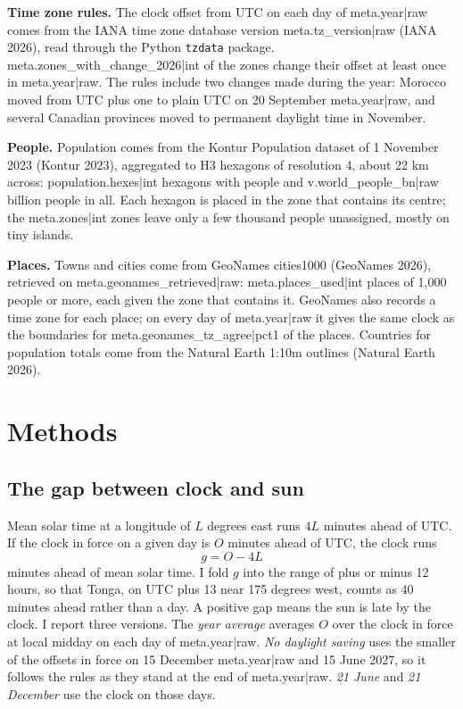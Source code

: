 \documentclass[11pt,a4paper]{article}
\begin{document}
\textbf{Time zone rules.} The clock offset from UTC on each day of {{meta.year|raw}} comes from the IANA time zone database version {{meta.tz_version|raw}} (IANA 2026), read through the Python \texttt{tzdata} package. {{meta.zones_with_change_2026|int}} of the zones change their offset at least once in {{meta.year|raw}}. The rules include two changes made during the year: Morocco moved from UTC plus one to plain UTC on 20 September {{meta.year|raw}}, and several Canadian provinces moved to permanent daylight time in November.

\textbf{People.} Population comes from the Kontur Population dataset of 1 November 2023 (Kontur 2023), aggregated to H3 hexagons of resolution 4, about 22 km across: {{population.hexes|int}} hexagons with people and {{v.world_people_bn|raw}} billion people in all. Each hexagon is placed in the zone that contains its centre; the {{meta.zones|int}} zones leave only a few thousand people unassigned, mostly on tiny islands.

\textbf{Places.} Towns and cities come from GeoNames cities1000 (GeoNames 2026), retrieved on {{meta.geonames_retrieved|raw}}: {{meta.places_used|int}} places of 1,000 people or more, each given the zone that contains it. GeoNames also records a time zone for each place; on every day of {{meta.year|raw}} it gives the same clock as the boundaries for {{meta.geonames_tz_agree|pct1}} of the places. Countries for population totals come from the Natural Earth 1:10m outlines (Natural Earth 2026).

\section{Methods}

\subsection{The gap between clock and sun}

Mean solar time at a longitude of $L$ degrees east runs $4L$ minutes ahead of UTC. If the clock in force on a given day is $O$ minutes ahead of UTC, the clock runs
\[ g = O - 4L \]
minutes ahead of mean solar time. I fold $g$ into the range of plus or minus 12 hours, so that Tonga, on UTC plus 13 near 175 degrees west, counts as 40 minutes ahead rather than a day. A positive gap means the sun is late by the clock. I report three versions. The \emph{year average} averages $O$ over the clock in force at local midday on each day of {{meta.year|raw}}. \emph{No daylight saving} uses the smaller of the offsets in force on 15 December {{meta.year|raw}} and 15 June 2027, so it follows the rules as they stand at the end of {{meta.year|raw}}. \emph{21 June} and \emph{21 December} use the clock on those days.
\end{document}
